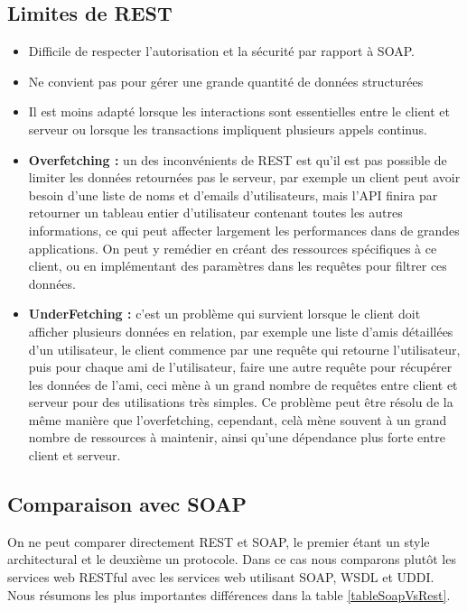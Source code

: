 \subsection{Limites de REST}
\begin{itemize}
	\item Difficile de respecter l'autorisation et la sécurité par rapport à SOAP.
	\item Ne convient pas pour gérer une grande quantité de données structurées
	\item Il est moins adapté lorsque les interactions sont essentielles entre le client et serveur ou lorsque les transactions impliquent plusieurs appels continus.
	\item \textbf{Overfetching :} un des inconvénients de REST est qu'il est pas possible de limiter les données retournées pas le serveur, par exemple un client peut avoir besoin d'une liste de noms et d'emails d'utilisateurs, mais l'API finira par retourner un tableau entier d'utilisateur contenant toutes les autres informations, ce qui peut affecter largement les performances dans de grandes applications. On peut y remédier en créant des ressources spécifiques à ce client, ou en implémentant des paramètres dans les requêtes pour filtrer ces données.
	\item \textbf{UnderFetching :} c'est un problème qui survient lorsque le client doit afficher plusieurs données en relation, par exemple une liste d'amis détaillées d'un utilisateur, le client commence par une requête qui retourne l'utilisateur, puis pour chaque ami de l'utilisateur, faire une autre requête pour récupérer les données de l'ami, ceci mène à un grand nombre de requêtes entre client et serveur pour des utilisations très simples.
	Ce problème peut être résolu de la même manière que l'overfetching, cependant, celà mène souvent à un grand nombre de ressources à maintenir, ainsi qu'une dépendance plus forte entre client et serveur.
\end{itemize}

\subsection{Comparaison avec SOAP}
On ne peut comparer directement REST et SOAP, le premier étant un style architectural et le deuxième un protocole. Dans ce cas nous comparons plutôt les services web RESTful avec les services web utilisant SOAP, WSDL et UDDI.
Nous résumons les plus importantes différences dans la table \ref{tableSoapVsRest}.\newline

